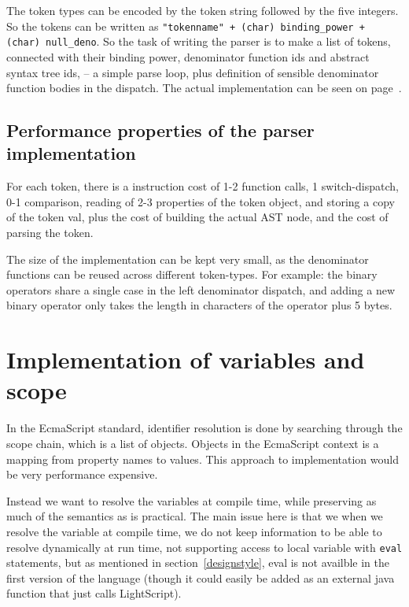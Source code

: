 \documentclass[11pt]{report}
\begin{document}
The token types can be encoded by the token string followed by the five integers.
So the tokens can be written as {\tt "tokenname" + (char) binding\_power + 
(char) null\_deno}. 
So the task of writing the parser is to make a list of tokens, connected with their binding power, denominator function ids and abstract syntax tree ids, -- a simple parse loop, plus definition of sensible denominator function bodies in the dispatch.
The actual implementation can be seen on page~\pageref{code-lightscript-parser}.


\subsection{Performance properties of the parser implementation}

For each token, there is a instruction cost of 1-2 function calls, 1 switch-dispatch, 0-1 comparison, reading of 2-3 properties of the token object, and storing a copy of the token val, plus the cost of building the actual AST node, and the cost of parsing the token.

The size of the implementation can be kept very small, as the denominator functions can be reused across different token-types. For example: the binary operators share a single case in the left denominator dispatch, and adding a new binary operator only takes the length in characters of the operator plus 5 bytes. 

\section{Implementation of variables and scope}
In the EcmaScript standard, identifier resolution is done by searching through the scope chain, which is a list of objects. Objects in the EcmaScript context is a mapping from property names to values. This approach to implementation would be very performance expensive.

Instead we want to resolve the variables at compile time, while preserving as much of the semantics as is practical. The main issue here is that we when we resolve the variable at compile time, we do not keep information to be able to resolve dynamically at run time, not supporting access to local variable with \verb|eval| statements, but as mentioned in section~\ref{designstyle}, eval is not availble in the first version of the language (though it could easily be added as an external java function that just calls LightScript).
\end{document}
